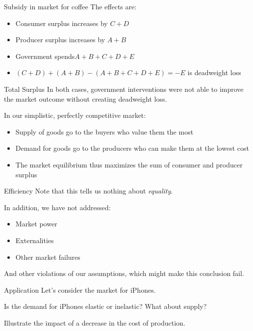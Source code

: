 \documentclass[aspectratio=169]{beamer}
\begin{document}
\begin{frame}{Subsidy in market for coffee}
    The effects are:
    \begin{itemize}
        \item Consumer surplus increases by $C + D$
        \item Producer surplus increases by $A + B$
        \item Government spends$ A + B + C + D + E $
        \item $(C+D) + (A + B) -  (A + B + C + D + E) = - E$ is deadweight loss
    \end{itemize}
\end{frame}

\begin{frame}{Total Surplus}
    In both cases, government interventions were not able to improve the market outcome without creating deadweight loss.

    \vspace{2mm}

    In our simplistic, perfectly competitive market:
    \begin{itemize}
        \item Supply of goods go to the buyers who value them the most
        \item Demand for goods go to the producers who can make them at the lowest cost
        \item The market equilibrium thus maximizes the sum of consumer and producer surplus
    \end{itemize}
\end{frame}

\begin{frame}{Efficiency}
    Note that this tells us nothing about \textit{equality}.

    \vspace{5mm}

    In addition, we have not addressed:
    \begin{itemize}
        \item Market power
        \item Externalities
        \item Other market failures
    \end{itemize}

    And other violations of our assumptions, which might make this conclusion fail.
\end{frame}

\begin{frame}{Application}
    Let's consider the market for iPhones.

    \vspace{2mm}

    Is the demand for iPhones elastic or inelastic? What about supply?

    \vspace{2mm}

    Illustrate the impact of a decrease in the cost of production.
\end{frame}
\end{document}
